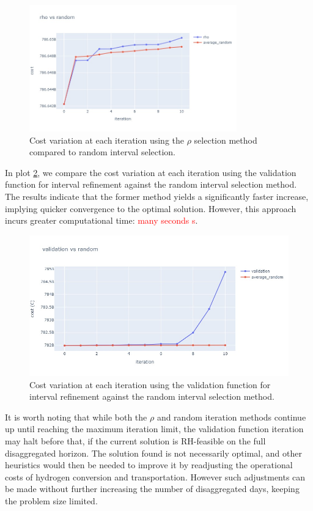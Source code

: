  \begin{figure}[htbp]
  \centering
  \includegraphics[width=0.8\textwidth]{images/rho_vas_average2.png}
  \caption{Cost variation at each iteration using the \(\rho\) selection method compared to random interval selection.}
  \label{fig:rho_vs_average}
\end{figure}

In plot \ref{fig:val_vs_average}, we compare the cost variation at each iteration using the validation function for interval refinement against the random interval selection method. 
The results indicate that the former method yields a significantly faster increase, implying quicker convergence to the optimal solution. 
However, this approach incurs greater computational time: \textcolor{red}{many seconds s}. 
\begin{figure}[htbp]
  \centering
  \includegraphics[width=\textwidth]{images/val_vs_average2.png}
  \caption{Cost variation at each iteration using the validation function for interval refinement against the random interval selection method.}
  \label{fig:val_vs_average}
\end{figure}

It is worth noting that while both the \(\rho\) and random iteration methods continue up until reaching the maximum iteration limit, the validation function iteration may halt before that, if the current solution is RH-feasible on the full disaggregated horizon.
The solution found is not necessarily optimal, and other heuristics would then be needed to improve it by readjusting the operational costs of hydrogen conversion and transportation. 
However such adjustments can be made without further increasing the number of disaggregated days, keeping the problem size limited.

